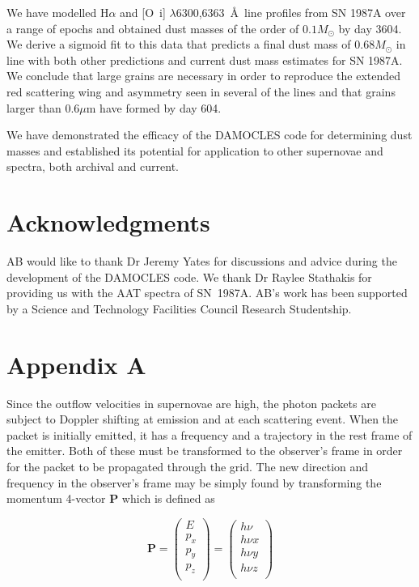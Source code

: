 \documentclass[useAMS,usenatbib,usegraphicx]{mnras}
\begin{document}
We have modelled H$\alpha$ and [O~{\sc i}] $\lambda$6300,6363~\AA\ line 
profiles 
from SN 1987A over a range of epochs and obtained dust masses of the order 
of $0.1M_{\odot}$ by day 3604.  We derive a sigmoid fit to this data that 
predicts a final dust mass of 0.68$M_{\odot}$ in line with both other 
predictions and current dust mass estimates for SN 1987A.  We conclude 
that large grains are necessary in order to reproduce the extended red 
scattering wing and asymmetry seen in several of the lines and that grains 
larger than $0.6\mu$m have formed by day 604.

We have demonstrated the efficacy of the DAMOCLES code for determining 
dust masses and established its potential for application to other 
supernovae and spectra, both archival and current.


\section*{Acknowledgments}

AB would like to thank Dr Jeremy Yates for discussions and advice during 
the development of the DAMOCLES code.  We thank Dr Raylee Stathakis for 
providing us with the AAT spectra of SN~1987A. AB's work has been 
supported by a Science and Technology Facilities Council Research 
Studentship.


{}


\appendix

\section[]{Appendix A}

Since the outflow velocities in supernovae are high, the photon packets 
are subject to Doppler shifting at emission and at each scattering event.  
When the packet is initially emitted, it has a frequency and a trajectory 
in the rest frame of the emitter. Both of these must be transformed to the 
observer's frame in order for the packet to be propagated through the 
grid.  The new direction and frequency in the observer's frame may be 
simply found by transforming the momentum 4-vector $\mathbf{P}$ which is 
defined as

\begin{equation}
\mathbf{P}=
\begin{pmatrix}
	E \\
	p_x \\
	p_y \\
	p_z \\
	\end{pmatrix} =
	\begin{pmatrix}
	h \nu \\
	h \nu x \\
	h \nu y \\
	h \nu z \\
	\end{pmatrix}
\end{equation}
\end{document}
